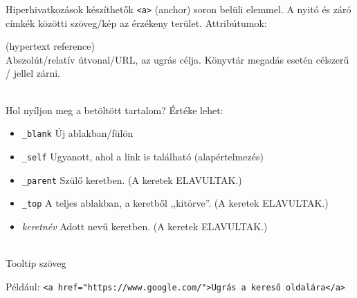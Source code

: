 \documentclass[usenames,dvipsnames,aspectratio=169]{beamer}
\newcommand{\kiemel}[1]{{\color{kiemelesszin}#1}}
\begin{document}
\begin{frame}
  \footnotesize
  Hiperhivatkozások készíthetők \texttt{<a>} (anchor) soron belüli elemmel. A nyitó és záró címkék közötti szöveg/kép az érzékeny terület. Attribútumok:
  \begin{description}[m]
    \item[\texttt{href}] (hypertext reference) \hfill \\ Abszolút/relatív útvonal/URL, az ugrás célja. Könyvtár megadás esetén célszerű / jellel zárni.
    \item[\texttt{target}] \hfill \\ Hol nyíljon meg a betöltött tartalom? Értéke lehet:
    \begin{itemize}
      \item \texttt{\_blank} Új ablakban/fülön
      \item \texttt{\_self} Ugyanott, ahol a link is található (alapértelmezés)
      \item \texttt{\_parent} Szülő keretben. (A keretek \kiemel{ELAVULTAK}.)
      \item \texttt{\_top} A teljes ablakban, a keretből ,,kitörve''. (A keretek \kiemel{ELAVULTAK}.)
      \item \emph{keretnév} Adott nevű keretben. (A keretek \kiemel{ELAVULTAK}.)
    \end{itemize}
    \item[\texttt{title}] \hfill \\ Tooltip szöveg
  \end{description}
  Például: \texttt{<a href="https://www.google.com/">Ugrás a kereső oldalára</a>}
\end{frame}
\end{document}
